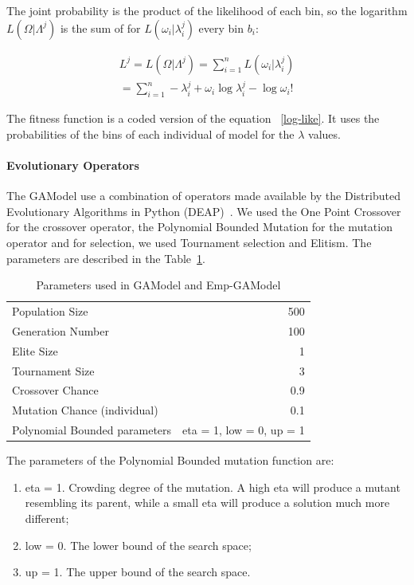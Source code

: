 The joint probability is the product of the likelihood of each bin, so
the logarithm $L(\Omega|\Lambda^j)$ is the sum of for
$L(\omega_i|\lambda_i^j)$ every bin $b_i$:

\begin{equation}\label{log-like}
\begin{split}
	L^j = L(\Omega|\Lambda^j) = \sum_{i=1}^{n}L(\omega_i|\lambda_i^j)  \\
	= \sum_{i=1}^{n} -\lambda_i^j + \omega_i\log\lambda_i^j - \log\omega_i!  
\end{split}
\end{equation}

The fitness function is a coded version of the equation
~\ref{log-like}. It uses the probabilities of the bins of each
individual of model for the $\lambda$ values.

\paragraph{Evolutionary Operators}\label{gaOperators}
The GAModel use a combination of operators made available by the Distributed Evolutionary Algorithms in Python (DEAP)~\cite{DeRainville}. We used the One Point Crossover for the crossover operator, the Polynomial Bounded Mutation for the mutation operator and for selection, we used Tournament selection and Elitism. The parameters are described in the Table~\ref{GAParameters5.1}.

\begin{table}[!ht]
  \caption{Parameters used in GAModel and Emp-GAModel}
  \label{GAParameters5.1}
  \begin{center}
  \begin{tabular}{|l|r|}
    \hline
    Population Size & 500\\
    Generation Number & 100\\
    Elite Size & 1\\
    Tournament Size & 3\\
    Crossover Chance & 0.9\\
    Mutation Chance (individual) & 0.1\\
	Polynomial Bounded parameters & eta = 1, low = 0, up = 1\\
    \hline    
  \end{tabular}
  \end{center}
\end{table}

The parameters of the Polynomial Bounded mutation function are: 
\begin{enumerate}
\item eta = 1. Crowding degree of the mutation. A high eta will produce a mutant resembling its parent, while a small eta will produce a solution much more different;
\item low = 0. The lower bound of the search space;
\item up = 1. The upper bound of the search space.
\end{enumerate}

